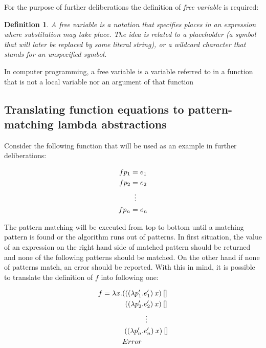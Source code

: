 \documentclass[12pt,a4paper]{report}
\newtheorem{definition}{Definition}[chapter]
\begin{document}
For the purpose of further deliberations the definition of \textit{free
variable} is required:
\begin{definition}
  \label{def:free_variable}
  A free variable is a notation that specifies places in an expression where
  substitution may take place. The idea is related to a placeholder (a symbol
  that will later be replaced by some literal string), or a wildcard character
  that stands for an unspecified symbol.
\end{definition}

In computer programming, a free variable is a variable referred to in a
function that is not a local variable nor an argument of that function

\subsection{Translating function equations to pattern-matching lambda
abstractions}
Consider the following function that will be used as an example in further
deliberations:

\vspace{-0.2in}
\begin{align*}
f p_{1} &= e_{1}\\
f p_{2} &= e_{2}\\
        &\mathrel{\makebox[\widthof{=}]{\vdots}} \\
f p_{n} &= e_{n}
\end{align*}

The pattern matching will be executed from top to bottom until a matching
pattern is found or the algorithm runs out of patterns. In first situation, the
value of an expression on the right hand side of matched pattern should be
returned and none of the following patterns should be matched. On the other
hand if none of patterns match, an error should be reported. With this in mind,
it is possible to translate the definition of $f$ into following one:

\vspace{-0.2in}
\begin{align*}
f = \lambda x.(((\lambda p_{1}'&.e_{1}')\:x)\:[] \\
        ((\lambda p_{2}'&.e_{2}')\:x)\:[] \\
                        &\mathrel{\makebox[\widthof{=}]{\vdots}} \\
        ((\lambda p_{n}'&.e_{n}')\:x)\:[] \\
        Error
\end{align*}
\end{document}
